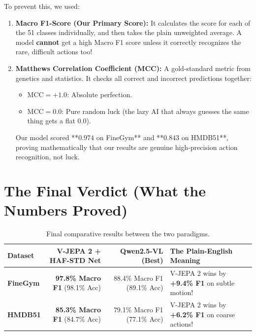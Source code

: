 \documentclass[a4paper, 11pt]{article}
\begin{document}
\begin{examplebox}
To prevent this, we used:
\begin{enumerate}
    \item \textbf{Macro F1-Score (Our Primary Score):}
    It calculates the score for each of the 51 classes individually, and then takes the plain unweighted average. A model \textbf{cannot} get a high Macro F1 score unless it correctly recognizes the rare, difficult actions too!
    \item \textbf{Matthews Correlation Coefficient (MCC):}
    A gold-standard metric from genetics and statistics. It checks all correct and incorrect predictions together:
    \begin{itemize}
        \item $\text{MCC} = +1.0$: Absolute perfection.
        \item $\text{MCC} = 0.0$: Pure random luck (the lazy AI that always guesses the same thing gets a flat $0.0$).
    \end{itemize}
    Our model scored **$0.974$ on FineGym** and **$0.843$ on HMDB51**, proving mathematically that our results are genuine high-precision action recognition, not luck.
\end{enumerate}
\end{examplebox}

\section{The Final Verdict (What the Numbers Proved)}

\begin{table}[h!]
\centering
\small
\renewcommand{\arraystretch}{1.3}
\begin{tabularx}{\textwidth}{l r r X}
\toprule
\textbf{Dataset} & \textbf{V-JEPA 2 + HAF-STD Net} & \textbf{Qwen2.5-VL (Best)} & \textbf{The Plain-English Meaning} \\
\midrule
\textbf{FineGym} & \textbf{97.8\% Macro F1} (98.1\% Acc) & 88.4\% Macro F1 (89.1\% Acc) & V-JEPA 2 wins by \textbf{+9.4\% F1} on subtle motion! \\
\textbf{HMDB51}  & \textbf{85.3\% Macro F1} (84.7\% Acc) & 79.1\% Macro F1 (77.1\% Acc) & V-JEPA 2 wins by \textbf{+6.2\% F1} on coarse actions! \\
\bottomrule
\end{tabularx}
\caption{Final comparative results between the two paradigms.}
\end{table}
\end{document}

